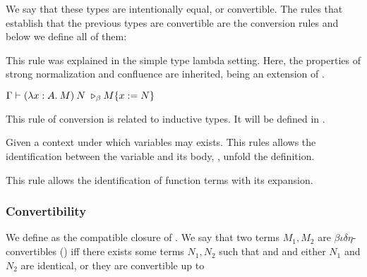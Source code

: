 We say that these types are intentionally equal, or convertible. The rules that establish that the previous 
types are convertible are the conversion rules and below we define all of them:

\begin{adjustwidth}{2em}{0cm}
\textDef{\betaRed{}} This rule was explained in the simple type lambda setting. Here, the properties of strong
normalization and confluence are inherited, being \CCw{} an extension of \CC{}.
\begin{center}
    $\convTyping{\reductionBeta{\app{(\abs{x}{A}{M})}{N}}{\subst{M}{x}{N}}}$
\end{center}

\textDef{\iotaRed{}} This rule of conversion is related to inductive types. It will be defined in 
.

\textDef{\deltaRed{}} Given a context under which variables may exists. This rules allows the identification
between the variable and its body, \ie{}, unfold the definition.
\begin{mathpar}
\end{mathpar}

\textDef{\etaExp{}} This rule allows the identification of function terms with its expansion.
\begin{mathpar}
\end{mathpar}
\end{adjustwidth}

\subsubsection{Convertibility}
We define  as the compatible closure of \reduction{\beta\iota\delta}.
We say that two terms $M_1, M_2$ are $\beta\iota\delta\eta$-convertibles ()
iff there exists some terms $N_1,N_2$ such that 
and  and either $N_1$ and $N_2$ are identical, or
they are convertible up to \etaExp{}

